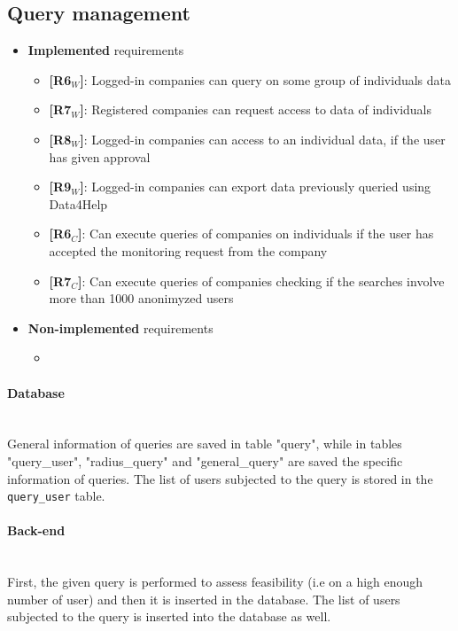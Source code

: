\subsection{Query management}
\begin{itemize}
    \item \textbf{Implemented} requirements
        \begin{itemize}
    \item \textbf{[R6$_W$]}: Logged-in companies can query on some group of individuals data
    \item \textbf{[R7$_W$]}: Registered companies can request access to data of individuals
    \item \textbf{[R8$_W$]}: Logged-in companies can access to an individual data, if the user has given approval
    \item \textbf{[R9$_W$]}: Logged-in companies can export data previously queried using Data4Help

    \item \textbf{[R6$_C$]}: Can execute queries of companies on individuals if the user has accepted the monitoring request from the company
    \item \textbf{[R7$_C$]}: Can execute queries of companies checking if the searches involve more than 1000 anonimyzed users 

        \end{itemize}
    \item \textbf{Non-implemented} requirements
    \begin{itemize}
            \item 
        \end{itemize}
\end{itemize}

\paragraph{Database} \mbox{}\\ 
General information of queries are saved in table "query", while in tables "query\_user", "radius\_query" and "general\_query" are saved the specific information of queries.
The list of users subjected to the query is stored in the \texttt{query\_user} table.

\paragraph{Back-end} \mbox{}\\  
First, the given query is performed to assess feasibility (i.e on a high enough number of user) and then it is inserted in the database.
The list of users subjected to the query is inserted into the database as well.

